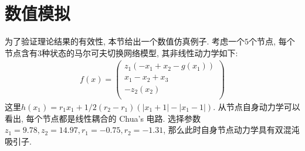 \section{数值模拟}\label{simulate}
    为了验证理论结果的有效性, 本节给出一个数值仿真例子. 考虑一个$5$个节点, 每个节点含有$3$种状态的马尔可夫切换网络模型, 其非线性动力学如下:
    \begin{align*}
           f(x)=\left(
                  \begin{array}{c}
                    z_1(-x_1+x_2-g(x_1)) \\
                    x_1-x_2+x_3 \\
                    -z_2(x_2) \\
                  \end{array}
                \right)
           \end{align*}
    这里$h(x_1)=r_1x_1+1/2(r_2-r_1)(|x_1+1|-|x_1-1|)$. 从节点自身动力学可以看出, 每个节点都是线性耦合的 Chua's 电路. 选择参数$z_1=9.78,z_2=14.97,r_1=-0.75,r_2=-1.31$, 那么此时自身节点动力学具有双混沌吸引子.

